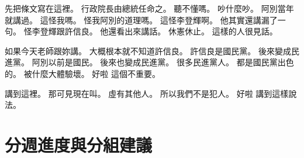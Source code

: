 \hypertarget{c01:cue:1440}{}先把條文寫在這裡。
\hypertarget{c01:cue:1441}{}行政院長由總統任命之。
\hypertarget{c01:cue:1442}{}聽不懂嗎。
\hypertarget{c01:cue:1443}{}吵什麼吵。
\hypertarget{c01:cue:1444}{}阿別當年就講過。
\hypertarget{c01:cue:1445}{}這怪我嗎。
\hypertarget{c01:cue:1446}{}怪我阿別的道理嗎。
\hypertarget{c01:cue:1447}{}這怪李登輝啊。
\hypertarget{c01:cue:1448}{}他其實還講漏了一句。
\hypertarget{c01:cue:1449}{}怪李登輝跟許信良。
\hypertarget{c01:cue:1450}{}他還看出來講話。
\hypertarget{c01:cue:1451}{}休憲休止。
\hypertarget{c01:cue:1452}{}這樣的人很見話。

\hypertarget{c01:cue:1453}{}如果今天老師跟妳講。
\hypertarget{c01:cue:1454}{}大概根本就不知道許信良。
\hypertarget{c01:cue:1455}{}許信良是國民黨。
\hypertarget{c01:cue:1456}{}後來變成民進黨。
\hypertarget{c01:cue:1457}{}阿別以前是國民。
\hypertarget{c01:cue:1458}{}後來也變成民進黨。
\hypertarget{c01:cue:1459}{}很多民進黨人。
\hypertarget{c01:cue:1460}{}都是國民黨出色的。
\hypertarget{c01:cue:1461}{}被什麼大體驗壞。
\hypertarget{c01:cue:1462}{}好啦 這個不重要。

\hypertarget{c01:cue:1463}{}講到這裡。
\hypertarget{c01:cue:1464}{}那可見現在叫。
\hypertarget{c01:cue:1465}{}虛有其他人。
\hypertarget{c01:cue:1466}{}所以我們不是犯人。
\hypertarget{c01:cue:1467}{}好啦 講到這樣說法。

\section{分週進度與分組建議}

